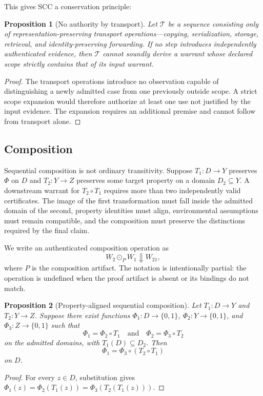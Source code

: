 \documentclass[11pt]{article}
\newtheorem{proposition}{Proposition}
\begin{document}
This gives SCC a conservation principle:
\begin{proposition}[No authority by transport]
Let $\mathcal{T}$ be a sequence consisting only of representation-preserving transport operations---copying, serialization, storage, retrieval, and identity-preserving forwarding. If no step introduces independently authenticated evidence, then $\mathcal{T}$ cannot soundly derive a warrant whose declared scope strictly contains that of its input warrant.
\end{proposition}
\begin{proof}
The transport operations introduce no observation capable of distinguishing a newly admitted case from one previously outside scope. A strict scope expansion would therefore authorize at least one use not justified by the input evidence. The expansion requires an additional premise and cannot follow from transport alone.
\end{proof}

\subsection{Composition}
Sequential composition is not ordinary transitivity. Suppose $T_1:D\to Y$ preserves $\Phi$ on $D$ and $T_2:Y\to Z$ preserves some target property on a domain $D_2\subseteq Y$. A downstream warrant for $T_2\circ T_1$ requires more than two independently valid certificates. The image of the first transformation must fall inside the admitted domain of the second, property identities must align, environmental assumptions must remain compatible, and the composition must preserve the distinctions required by the final claim.

We write an authenticated composition operation as
\[
W_2\odot_P W_1 \Downarrow W_{21},
\]
where $P$ is the composition artifact. The notation is intentionally partial: the operation is undefined when the proof artifact is absent or its bindings do not match.

\begin{proposition}[Property-aligned sequential composition]
Let $T_1:D\to Y$ and $T_2:Y\to Z$. Suppose there exist functions $\Phi_1:D\to\{0,1\}$, $\Phi_2:Y\to\{0,1\}$, and $\Phi_3:Z\to\{0,1\}$ such that
\[
\Phi_1=\Phi_2\circ T_1
\quad\text{and}\quad
\Phi_2=\Phi_3\circ T_2
\]
on the admitted domains, with $T_1(D)\subseteq D_2$. Then
\[
\Phi_1=\Phi_3\circ(T_2\circ T_1)
\]
on $D$.
\end{proposition}
\begin{proof}
For every $z\in D$, substitution gives $\Phi_1(z)=\Phi_2(T_1(z))=\Phi_3(T_2(T_1(z)))$.
\end{proof}
\end{document}
